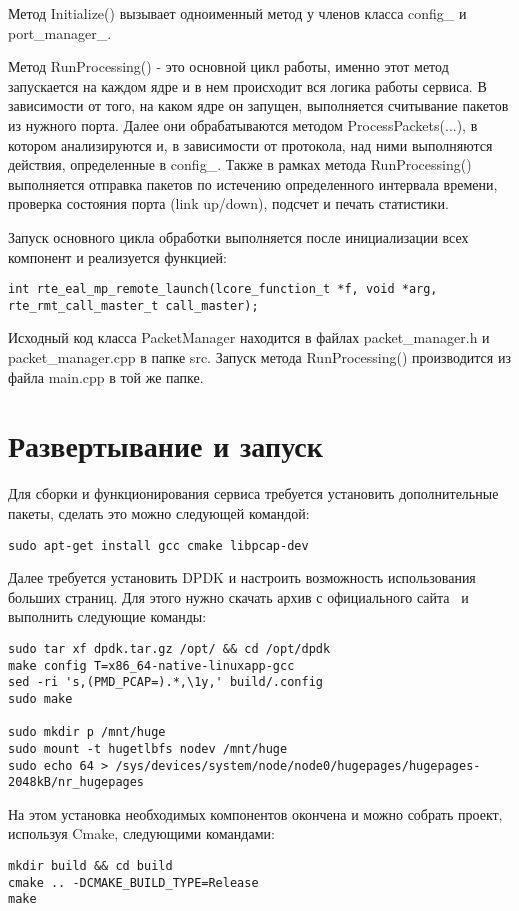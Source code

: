 Метод Initialize() вызывает одноименный метод у членов класса config\_ и port\_manager\_.

Метод RunProcessing() - это основной цикл работы, именно этот метод  запускается на каждом ядре и в нем происходит вся логика работы сервиса. В зависимости от того, на каком ядре он запущен, выполняется считывание пакетов из нужного порта. Далее они обрабатываются методом ProcessPackets(...), в котором анализируются и, в зависимости от протокола, над ними выполняются действия, определенные в config\_. Также в рамках метода RunProcessing() выполняется отправка пакетов по истечению определенного интервала времени, проверка состояния порта (link up/down), подсчет и печать статистики.

Запуск основного цикла обработки выполняется после инициализации всех компонент и реализуется функцией:
\begin{lstlisting}
int rte_eal_mp_remote_launch(lcore_function_t *f, void *arg, rte_rmt_call_master_t call_master);
\end{lstlisting}

Исходный код класса PacketManager находится в файлах packet\_manager.h и packet\_manager.cpp в папке src. Запуск метода RunProcessing() производится из файла main.cpp в той же папке.

\section{Развертывание и запуск}
Для сборки и функционирования сервиса требуется установить дополнительные пакеты, сделать это можно следующей командой:
\begin{lstlisting}
sudo apt-get install gcc cmake libpcap-dev
\end{lstlisting}

Далее требуется установить DPDK и настроить возможность использования больших страниц. Для этого нужно скачать архив с официального сайта~\cite{dpdk_descr} и выполнить следующие команды:
\begin{lstlisting}
sudo tar xf dpdk.tar.gz /opt/ && cd /opt/dpdk
make config T=x86_64-native-linuxapp-gcc
sed -ri 's,(PMD_PCAP=).*,\1y,' build/.config
sudo make

sudo mkdir p /mnt/huge
sudo mount -t hugetlbfs nodev /mnt/huge
sudo echo 64 > /sys/devices/system/node/node0/hugepages/hugepages-2048kB/nr_hugepages
\end{lstlisting}

На этом установка необходимых компонентов окончена и можно собрать проект, используя Cmake, следующими командами:
\begin{lstlisting}
mkdir build && cd build
cmake .. -DCMAKE_BUILD_TYPE=Release
make
\end{lstlisting}

